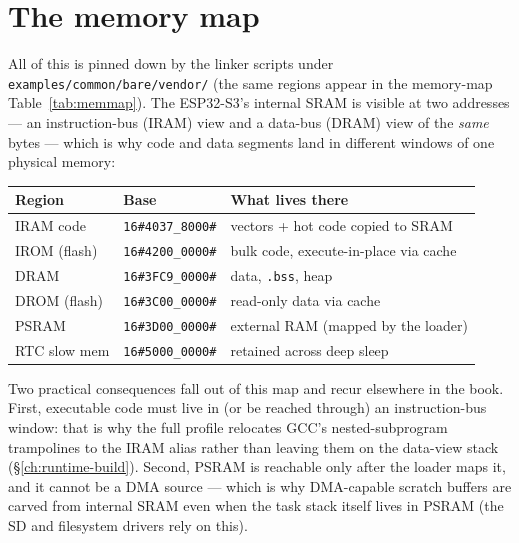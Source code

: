 \section{The memory map}

All of this is pinned down by the linker scripts under
\texttt{examples/common/bare/vendor/} (the same regions appear in the memory-map
Table~\ref{tab:memmap}). The ESP32-S3's internal SRAM is visible at two
addresses --- an instruction-bus (IRAM) view and a data-bus (DRAM) view of the
\emph{same} bytes --- which is why code and data segments land in different
windows of one physical memory:

\begin{center}
\begin{tabular}{l l l}
\toprule
\textbf{Region} & \textbf{Base} & \textbf{What lives there} \\ \midrule
IRAM code     & \texttt{16\#4037\_8000\#} & vectors + hot code copied to SRAM \\
IROM (flash)  & \texttt{16\#4200\_0000\#} & bulk code, execute-in-place via cache \\
DRAM          & \texttt{16\#3FC9\_0000\#} & data, \texttt{.bss}, heap \\
DROM (flash)  & \texttt{16\#3C00\_0000\#} & read-only data via cache \\
PSRAM         & \texttt{16\#3D00\_0000\#} & external RAM (mapped by the loader) \\
RTC slow mem  & \texttt{16\#5000\_0000\#} & retained across deep sleep \\
\bottomrule
\end{tabular}
\end{center}

Two practical consequences fall out of this map and recur elsewhere in the book.
First, executable code must live in (or be reached through) an instruction-bus
window: that is why the full profile relocates GCC's nested-subprogram
trampolines to the IRAM alias rather than leaving them on the data-view stack
(\S\ref{ch:runtime-build}). Second, PSRAM is reachable only after the loader maps
it, and it cannot be a DMA source --- which is why DMA-capable scratch buffers are
carved from internal SRAM even when the task stack itself lives in PSRAM (the SD
and filesystem drivers rely on this).

